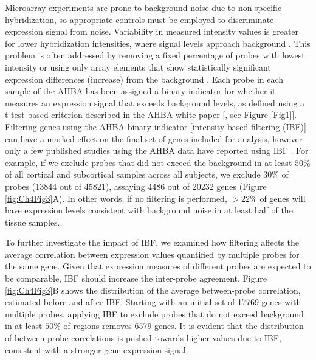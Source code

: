 \documentclass[10pt,A4]{article}
\begin{document}
Microarray experiments are prone to background noise due to non-specific hybridization, so appropriate controls must be employed to discriminate expression signal from noise. Variability in measured intensity values is greater for lower hybridization intensities, where signal levels approach background \citep{Quackenbush2002a}. This problem is often addressed by removing a fixed percentage of probes with lowest intensity or using only array elements that show statistically significant expression differences (increase) from the background \citep{Quackenbush2002a}. Each probe in each sample of the AHBA has been assigned a binary indicator for whether it measures an expression signal that exceeds background levels, as defined using a t-test based criterion described in the AHBA white paper [\citep{AHBAdoc}, see Figure \ref{Fig1}]. Filtering genes using the AHBA binary indicator [intensity based filtering (IBF)] can have a marked effect on the final set of genes included for analysis, however only a few published studies using the AHBA data have reported using IBF \citep{Hawrylycz2012,Richiardi2015,Burt2018}. For example, if we exclude probes that did not exceed the background in at least $50\%$ of all cortical and subcortical samples across all subjects, we exclude $30\%$ of probes (\num{13844} out of \num{45821}), assaying \num{4486} out of \num{20232} genes (Figure \ref{fig:Ch4Fig3}A). In other words, if no filtering is performed, $>22\%$ of genes will have expression levels consistent with background noise in at least half of the tissue samples.

To further investigate the impact of IBF, we examined how filtering affects the average correlation between expression values quantified by multiple probes for the same gene. Given that expression measures of different probes are expected to be comparable, IBF should increase the inter-probe agreement. Figure \ref{fig:Ch4Fig3}B shows the distribution of the average between-probe correlation, estimated before and after IBF. Starting with an initial set of \num{17769} genes with multiple probes, applying IBF to exclude probes that do not exceed background in at least $50\%$ of regions removes \num{6579} genes. It is evident that the distribution of between-probe correlations is pushed towards higher values due to IBF, consistent with a stronger gene expression signal.
\end{document}
